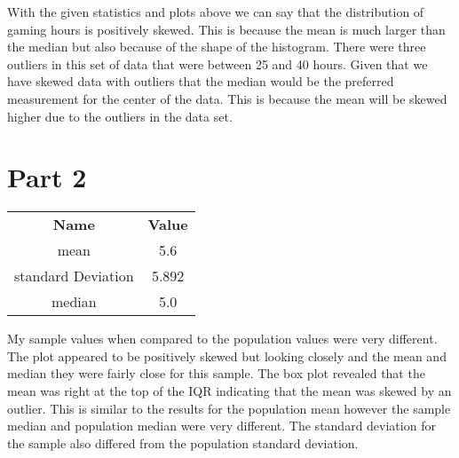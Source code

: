 \documentclass[letterpaper, onecolumn,10pt]{IEEEtran}
\begin{document}
            With the given statistics and plots above we can say that the distribution of gaming hours is positively skewed. This is because the mean is much larger than the median but also because of the shape of the histogram. There were three outliers in this set of data that were between 25 and 40 hours. Given that we have skewed data with outliers that the median would be the preferred measurement for the center of the data. This is because the mean will be skewed higher due to the outliers in the data set.\\
            
            
        \section{Part 2}		
        
        \begin{table}[H]
            \begin{tabular}{|c|c|}
                \textbf{Name} & \textbf{Value} \\
                 mean & 5.6\\
                 standard Deviation & 5.892\\
                 median & 5.0\\
            \end{tabular}
        \end{table}
        
        My sample values when compared to the population values were very different. The plot appeared to be positively skewed but looking closely and the mean and median they were fairly close for this sample. The box plot revealed that the mean was right at the top of the IQR indicating that the mean was skewed by an outlier. This is similar to the results for the population mean however the sample median and population median were very different. The standard deviation for the sample also differed from the population standard deviation.\\
        
        
		
\end{document}

